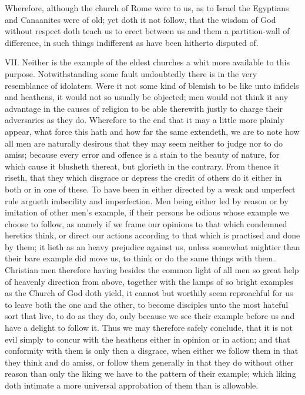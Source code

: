 Wherefore, although the church of Rome were to us, as to Israel the Egyptians and Canaanites were of old; yet doth it not follow, that the wisdom of God without respect doth teach us to erect between us and them a partition-wall of difference, in such things indifferent as have been hitherto disputed of.

VII. Neither is the example of the eldest churches a whit more available to this purpose. Notwithstanding some fault undoubtedly there is in the very resemblance of idolaters. Were it not some kind of blemish to be like unto infidels and heathens, it would not so usually be objected; men would not think it any advantage in the causes of religion to be able therewith justly to charge their adversaries as they do. Wherefore to the end that it may a little more plainly appear, what force this hath and how far the same extendeth, we are to note how all men are naturally desirous that they may seem neither to judge nor to do amiss; because every error and offence is a stain to the beauty of nature, for which cause  it blusheth thereat, but glorieth in the contrary. From thence it riseth, that they which disgrace or depress the credit of others do it either in both or in one of these. To have been in either directed by a weak and unperfect rule argueth imbecility and imperfection. Men being either led by reason or by imitation of other men’s example, if their persons be odious whose example we choose to follow, as namely if we frame our opinions to that which condemned heretics think, or direct our actions according to that which is practised and done by them; it lieth as an heavy prejudice against us, unless somewhat mightier than their bare example did move us, to think or do the same things with them. Christian men therefore having besides the common light of all men so great help of heavenly direction from above, together with the lamps of so bright examples as the Church of God doth yield, it cannot but worthily seem reproachful for us to leave both the one and the other, to become disciples unto the most hateful sort that live, to do as they do, only because we see their example before us and have a delight to follow it. Thus we may therefore safely conclude, that it is not evil simply to concur with the heathens either in opinion or in action; and that conformity with them is only then a disgrace, when either we follow them in that they think and do amiss, or follow them generally in that they do without other reason than only the liking we have to the pattern of their example; which liking doth intimate a more universal approbation of them than is allowable.

